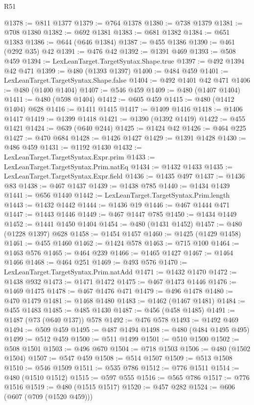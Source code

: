 \begin{lexlean}{R51}
\begin{coremodule}
@1378 := @811 @1377
@1379 := @764 @1378
@1380 := @738 @1379
@1381 := @708 @1380
@1382 := @692 @1381
@1383 := @681 @1382
@1384 := @651 @1383
@1386 := @644 (@646 @1384)
@1387 := @455 @1386
@1390 := @461 (@292 @35) @42
@1391 := @476 @42
@1392 := @1391 @469
@1393 := @508 @459
@1394 := LexLeanTarget.TargetSyntax.Shape.true
@1397 := @492 @1394 @42 @471
@1399 := @480 (@1393 @1397)
@1400 := @484 @459
@1401 := LexLeanTarget.TargetSyntax.Shape.false
@1404 := @492 @1401 @42 @471
@1406 := @480 (@1400 @1404)
@1407 := @546 @459
@1409 := @480 (@1407 @1404)
@1411 := @480 (@598 @1404)
@1412 := @605 @459
@1415 := @480 (@1412 @1404) @628
@1416 := @1411 @1415
@1417 := @1409 @1416
@1418 := @1406 @1417
@1419 := @1399 @1418
@1421 := @1390 (@1392 @1419)
@1422 := @455 @1421
@1424 := @639 (@640 @244)
@1425 := @1424 @42
@1426 := @464 @225
@1427 := @470 @684
@1428 := @1426 @1427
@1429 := @1391 @1428
@1430 := @486 @459
@1431 := @1192 @1430
@1432 := LexLeanTarget.TargetSyntax.Expr.prim
@1433 := LexLeanTarget.TargetSyntax.Prim.natEq
@1434 := @1432 @1433
@1435 := LexLeanTarget.TargetSyntax.Expr.field
@1436 := @1435 @497
@1437 := @1436 @83
@1438 := @467 @1437
@1439 := @1438 @785
@1440 := @1434 @1439
@1441 := @656 @1440
@1442 := LexLeanTarget.TargetSyntax.Prim.length
@1443 := @1432 @1442
@1444 := @1436 @19
@1446 := @467 @1444 @471
@1447 := @1443 @1446
@1449 := @467 @1447 @785
@1450 := @1434 @1449
@1452 := @1441 @1450 @1404
@1454 := @480 (@1431 @1452)
@1457 := @480 (@1228 @1397) @628
@1458 := @1454 @1457
@1460 := @1425 (@1429 @1458)
@1461 := @455 @1460
@1462 := @1424 @578
@1463 := @715 @100
@1464 := @1463 @576
@1465 := @464 @239
@1466 := @1465 @1427
@1467 := @1464 @1466
@1468 := @464 @251
@1469 := @493 @576
@1470 := LexLeanTarget.TargetSyntax.Prim.natAdd
@1471 := @1432 @1470
@1472 := @1438 @932
@1473 := @1471 @1472
@1475 := @467 @1473 @1446
@1476 := @1469 @1475
@1478 := @467 @1476 @471
@1479 := @496 @1478
@1480 := @470 @1479
@1481 := @1468 @1480
@1483 := @1462 (@1467 @1481)
@1484 := @455 @1483
@1485 := @485 @1430
@1487 := @456 (@458 @1485)
@1491 := @1487 (@73 (@640 @137)) @578
@1492 := @476 @578
@1493 := @1492 @469
@1494 := @509 @459
@1495 := @487 @1494
@1498 := @480 (@484 @1495 @495)
@1499 := @512 @459
@1500 := @511 @1499
@1501 := @510 @1500
@1502 := @508 @1501
@1503 := @496 @670
@1504 := @718 @1503
@1506 := @480 (@1502 @1504)
@1507 := @547 @459
@1508 := @514 @1507
@1509 := @513 @1508
@1510 := @546 @1509
@1511 := @535 @786
@1512 := @776 @1511
@1514 := @480 (@1510 @1512)
@1515 := @597 @555
@1516 := @565 @786
@1517 := @776 @1516
@1519 := @480 (@1515 @1517)
@1520 := @457 @282
@1524 := @606 (@607 (@709 (@1520 @459)))

\end{coremodule}
\end{lexlean}
